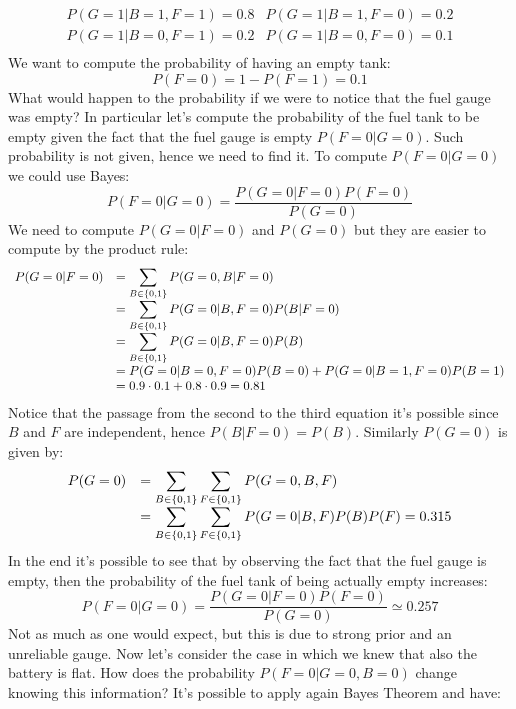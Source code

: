 \[
  \begin{array}{ll}
    P(G=1\vert B=1,F=1)=0.8&P(G=1\vert B=1,F=0)=0.2\\
    P(G=1\vert B=0,F=1)=0.2&P(G=1\vert B=0,F=0)=0.1\\
  \end{array}
\]
We want to compute the probability of having an empty tank:
\[P(F=0)=1-P(F=1)=0.1\]
What would happen to the probability if we were to notice that the fuel gauge was empty? In particular let's compute the probability of the fuel tank to be empty given the fact that the fuel gauge is empty $P(F=0\vert G=0)$. Such probability is not given, hence we need to find it. To compute $P(F=0\vert G=0)$ we could use Bayes:
\[P(F=0\vert G=0)=\dfrac{P(G=0\vert F=0)P(F=0)}{P(G=0)}\]
We need to compute $P(G=0\vert F=0)$ and $P(G=0)$ but they are easier to compute by the product rule:
\[
\begin{array}{ll}
  P(G=0\vert F=0)&=\displaystyle\sum_{B\in\{0,1\}}P(G=0,B\vert F=0)\\
                 &=\displaystyle\sum_{B\in\{0,1\}}P(G=0\vert B,F=0)P(B\vert F=0)\\
                 &=\displaystyle\sum_{B\in\{0,1\}}P(G=0\vert B,F=0)P(B)\\
                 &=P(G=0\vert B=0, F=0)P(B=0)+P(G=0\vert B=1, F=0)P(B=1)\\
                 &=0.9\cdot0.1+0.8\cdot 0.9=0.81
\end{array}
\]
Notice that the passage from the second to the third equation it's possible since $B$ and $F$ are independent, hence $P(B\vert F=0)=P(B)$.\newline 
Similarly $P(G=0)$ is given by:
\[
\begin{array}{ll}
  P(G=0)&=\displaystyle\sum_{B\in\{0,1\}}\displaystyle\sum_{F\in\{0,1\}}P(G=0,B,F)\\
        &=\displaystyle\sum_{B\in\{0,1\}}\displaystyle\sum_{F\in\{0,1\}}P(G=0\vert B,F)P(B)P(F)=0.315  
\end{array}
\]
In the end it's possible to see that by observing the fact that the fuel gauge is empty, then the probability of the fuel tank of being actually empty increases:
\[P(F=0\vert G=0)=\dfrac{P(G=0\vert F=0)P(F=0)}{P(G=0)}\simeq 0.257\]
Not as much as one would expect, but this is due to strong prior and an unreliable gauge. \newline
Now let's consider the case in which we knew that also the battery is flat. How does the probability $P(F=0\vert G=0,B=0)$ change knowing this information? \newline
It's possible to apply again Bayes Theorem and have:
